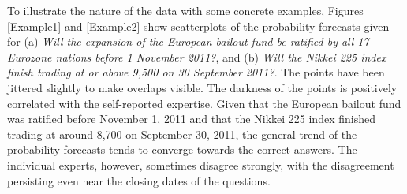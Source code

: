 \documentclass[aoas, preprint]{imsart}
\numberwithin{equation}{section}
\theoremstyle{plain}
\begin{document}
To illustrate the nature of the data with some concrete examples, Figures \ref{Example1} and \ref{Example2} show scatterplots of the probability forecasts given for (a) \textit{Will the expansion of the European bailout fund be ratified by all 17 Eurozone nations before 1 November 2011?}, and (b) \textit{Will the Nikkei 225 index finish trading at or above 9,500 on 30 September 2011?}. The points have been jittered slightly to make overlaps visible. The darkness of the points is positively correlated with the self-reported expertise. Given that the European bailout fund was ratified before November 1, 2011 and that the Nikkei 225 index finished trading at around 8,700 on September 30, 2011, the general trend of the probability forecasts tends to converge towards the correct answers. The individual experts, however, sometimes disagree strongly, with the disagreement persisting even near the closing dates of the questions. 
\end{document}
